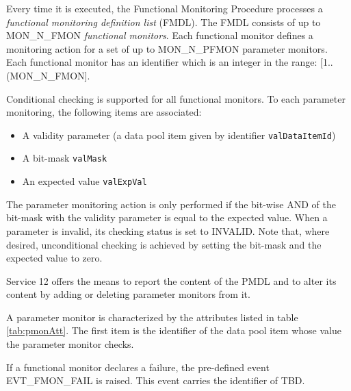 \documentclass{pnp_article}
\begin{document}
Every time it is executed, the Functional Monitoring Procedure processes a \textit{functional monitoring definition list} (FMDL). The FMDL consists of up to MON\_N\_FMON \textit{functional monitors}. Each functional monitor defines a monitoring action for a set of up to MON\_N\_PFMON parameter monitors. Each functional monitor has an identifier which is an integer in the range: [1..(MON\_N\_FMON].

Conditional checking is supported for all functional monitors. To each parameter monitoring, the following items are associated: 

\begin{itemize}
\item A validity parameter (a data pool item given by identifier \texttt{valDataItemId})
\item A bit-mask \texttt{valMask}
\item An expected value \texttt{valExpVal}
\end{itemize}

The parameter monitoring action is only performed if the bit-wise AND of the bit-mask with the validity parameter is equal to the expected value. When a parameter is invalid, its checking status is set to INVALID. Note that, where desired, unconditional checking is achieved by setting the bit-mask and the expected value to zero.

Service 12 offers the means to report the content of the PMDL and to alter its content by adding or deleting parameter monitors from it.

A parameter monitor is characterized by the attributes listed in table \ref{tab:pmonAtt}. The first item is the identifier of the data pool item whose value the parameter monitor checks. 






If a functional monitor declares a failure, the pre-defined event EVT\_FMON\_FAIL is raised. This event carries the identifier of TBD.
\end{document}
